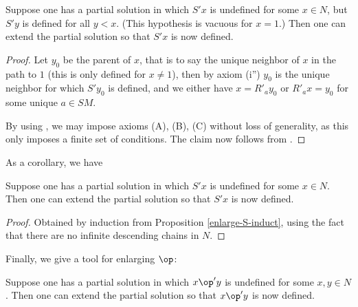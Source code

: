 \begin{proposition}\label{enlarge-S-induct}\leanok  Suppose one has a partial solution in which $S'x$ is undefined for some $x \in N$, but $S'y$ is defined for all $y < x$.  (This hypothesis is vacuous for $x=1$.) Then one can extend the partial solution so that $S'x$ is now defined.
\end{proposition}

\begin{proof}
  \leanok  Let $y_0$ be the parent of $x$, that is to say the unique neighbor of $x$ in the path to $1$ (this is only defined for $x \neq 1$), then by axiom (i'') $y_0$ is the unique neighbor for which $S'y_0$ is defined, and we either have $x = R'_a y_0$ or $R'_a x = y_0$ for some unique $a \in SM$.

  By using , we may impose axioms (A), (B), (C) without loss of generality, as this only imposes a finite set of conditions.  The claim now follows from .
\end{proof}


As a corollary, we have

\begin{proposition}[Enlarging $S'$]\label{enlarge-S}\leanok  Suppose one has a partial solution in which $S'x$ is undefined for some $x \in N$.  Then one can extend the partial solution so that $S'x$ is now defined.
\end{proposition}

\begin{proof}\leanok  Obtained by induction from Proposition \ref{enlarge-S-induct}, using the fact that there are no infinite descending chains in $N$.
\end{proof}

Finally, we give a tool for enlarging $\op$:

\begin{proposition}[Enlarging $\op$]\label{enlarge-op}\leanok  Suppose one has a partial solution in which $x \op' y$ is undefined for some $x,y \in N$.  Then one can extend the partial solution so that $x \op' y$ is now defined.
\end{proposition}

